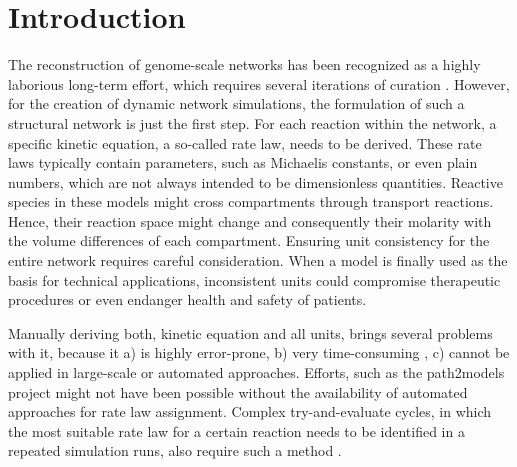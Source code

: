 \documentclass{bioinfo}
\begin{document}
\section{Introduction}

The reconstruction of genome-scale networks has been recognized as a highly laborious long-term effort, which requires several iterations of curation \citep{Thiele2010}.
However, for the creation of dynamic network simulations, the formulation of such a structural network is just the first step.
For each reaction within the network, a specific kinetic equation, a so-called rate law, needs to be derived.
These rate laws typically contain parameters, such as Michaelis constants, or even plain numbers, which are not always intended to be dimensionless quantities.
Reactive species in these models might cross compartments through transport reactions.
Hence, their reaction space might change and consequently their molarity with the volume differences of each compartment.
Ensuring unit consistency for the entire network requires careful consideration.
When a model is finally used as the basis for technical applications, inconsistent units could compromise 
therapeutic procedures or even endanger health and safety of patients.

Manually deriving both, kinetic equation and all units, brings several problems with it, because it
a) is highly error-prone, %
b) very time-consuming \citep{Draeger2010},
c) cannot be applied in large-scale or automated approaches.
Efforts, such as the path2models project \citep{Buechel2013} might not have been possible without the availability of automated approaches for rate law assignment.
Complex try-and-evaluate cycles, in which the most suitable rate law for a certain reaction needs to be identified in a repeated simulation runs, also require such a method \citep{Draeger2011}.
\end{document}
